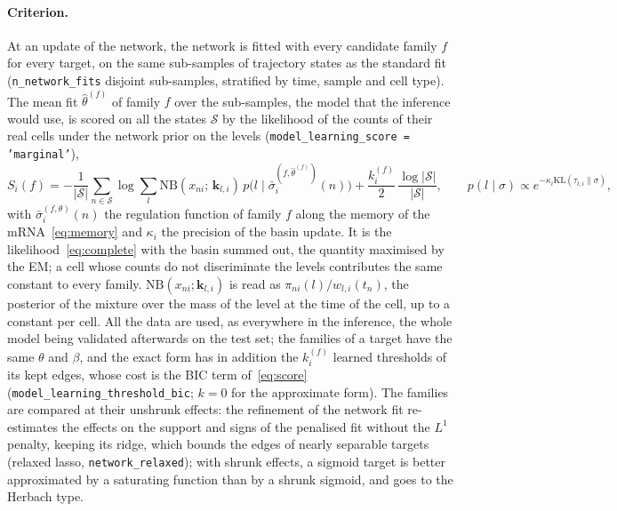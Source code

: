 \documentclass[a4paper, 11pt]{article}
\theoremstyle{plain}
\theoremstyle{remark}
\begin{document}
\paragraph{Criterion.} At an update of the network, the network is fitted with every candidate family $f$ for every target, on the same sub-samples of trajectory states as the standard fit (\texttt{n\_network\_fits} disjoint sub-samples, stratified by time, sample and cell type). The mean fit $\hat\theta^{(f)}$ of family $f$ over the sub-samples, the model that the inference would use, is scored on all the states $\mathcal{S}$ by the likelihood of the counts of their real cells under the network prior on the levels (\texttt{model\_learning\_score = 'marginal'}),
\begin{equation}\label{eq:score}
S_i(f) = -\frac{1}{|\mathcal{S}|}\sum_{n \in \mathcal{S}} \log \sum_l \mathrm{NB}(x_{ni};\, \mathbf{k}_{l,i})\, p\bigl(l \mid \bar\sigma_i^{(f,\hat\theta^{(f)})}(n)\bigr) + \frac{k_i^{(f)}}{2}\,\frac{\log|\mathcal{S}|}{|\mathcal{S}|}, \qquad p(l \mid \sigma) \propto e^{-\kappa_i \mathrm{KL}(\tau_{l,i} \| \sigma)},
\end{equation}
with $\bar\sigma_i^{(f,\theta)}(n)$ the regulation function of family $f$ along the memory of the mRNA~\eqref{eq:memory} and $\kappa_i$ the precision of the basin update. It is the likelihood~\eqref{eq:complete} with the basin summed out, the quantity maximised by the EM; a cell whose counts do not discriminate the levels contributes the same constant to every family. $\mathrm{NB}(x_{ni};\mathbf{k}_{l,i})$ is read as $\pi_{ni}(l)/w_{l,i}(t_n)$, the posterior of the mixture over the mass of the level at the time of the cell, up to a constant per cell. All the data are used, as everywhere in the inference, the whole model being validated afterwards on the test set; the families of a target have the same $\theta$ and $\beta$, and the exact form has in addition the $k_i^{(f)}$ learned thresholds of its kept edges, whose cost is the BIC term of~\eqref{eq:score} (\texttt{model\_learning\_threshold\_bic}; $k = 0$ for the approximate form). The families are compared at their unshrunk effects: the refinement of the network fit re-estimates the effects on the support and signs of the penalised fit without the $L^1$ penalty, keeping its ridge, which bounds the edges of nearly separable targets (relaxed lasso, \texttt{network\_relaxed}); with shrunk effects, a sigmoid target is better approximated by a saturating function than by a shrunk sigmoid, and goes to the Herbach type.
\end{document}
